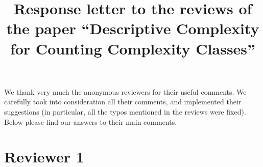 \documentclass[a4paper]{article}
\begin{document}
\title{Response letter to the reviews of the paper ``Descriptive Complexity for Counting Complexity Classes''}

\maketitle

We thank very much the anonymous reviewers for their useful comments. We carefully took into consideration all their comments, and implemented their suggestions (in particular, all the typos mentioned in the reviews were fixed). Below please find our answers to their main comments.

\section*{Reviewer 1}
\end{document}
